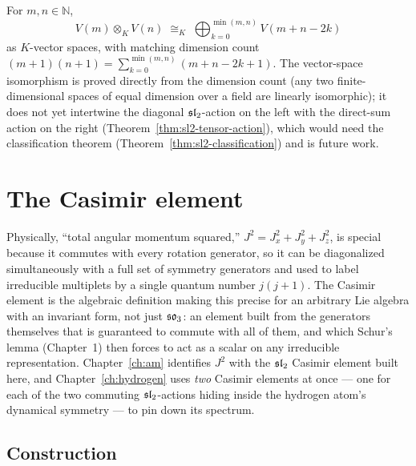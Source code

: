 \begin{theorem}
  \label{thm:sl2-clebsch-gordan}
  \leanok
  For $m, n \in \mathbb{N}$,
  \[
    V(m) \otimes_K V(n) \;\cong_K\; \bigoplus_{k=0}^{\min(m,n)} V(m+n-2k)
  \]
  as $K$-vector spaces, with matching dimension count $(m+1)(n+1) =
  \sum_{k=0}^{\min(m,n)} (m+n-2k+1)$. The vector-space isomorphism is proved
  directly from the dimension count (any two finite-dimensional spaces of
  equal dimension over a field are linearly isomorphic); it does not yet
  intertwine the diagonal $\mathfrak{sl}_2$-action on the left with the direct-sum
  action on the right (Theorem~\ref{thm:sl2-tensor-action}), which would
  need the classification theorem (Theorem~\ref{thm:sl2-classification})
  and is future work.
\end{theorem}

\chapter{The Casimir element}
\label{ch:casimir}

Physically, ``total angular momentum squared,'' $J^2 = J_x^2+J_y^2+J_z^2$, is
special because it commutes with every rotation generator, so it can be
diagonalized simultaneously with a full set of symmetry generators and used
to label irreducible multiplets by a single quantum number $j(j+1)$. The
Casimir element is the algebraic definition making this precise for an
arbitrary Lie algebra with an invariant form, not just $\mathfrak{so}_3$: an
element built from the generators themselves that is guaranteed to commute
with all of them, and which Schur's lemma (Chapter~1) then forces to act as
a scalar on any irreducible representation. Chapter~\ref{ch:am} identifies
$J^2$ with the $\mathfrak{sl}_2$ Casimir element built here, and
Chapter~\ref{ch:hydrogen} uses \emph{two} Casimir elements at once ---
one for each of the two commuting $\mathfrak{sl}_2$-actions hiding inside the
hydrogen atom's dynamical symmetry --- to pin down its spectrum.

\section{Construction}
\label{sec:cas-basic}

